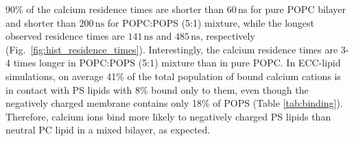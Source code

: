 \documentclass[journal=jpcbfk,manuscript=article]{achemso}
\begin{document}
90\% of the calcium residence times are shorter than $60\,\mathrm{ns}$ for pure POPC bilayer
and shorter than $200\,\mathrm{ns}$ for POPC:POPS (5:1) mixture, while the
longest observed residence times are $141\,\mathrm{ns}$ and $485\,\mathrm{ns}$, respectively (Fig.~\ref{fig:hist_residence_times}).
Interestingly, the calcium residence times are 3-4 times longer in POPC:POPS (5:1) mixture than in pure POPC.
In ECC-lipid simulations, on average 41\% of the total population of bound calcium cations is in contact with PS lipids
with 8\% bound only to them, even though the negatively charged membrane contains only 18\% of POPS (Table \ref{tab:binding}).
Therefore, calcium ions bind more likely to negatively charged PS lipids than neutral PC lipid in a mixed bilayer, as expected.


\end{document}
